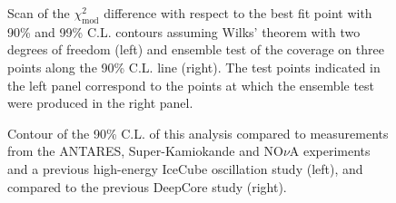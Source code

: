 %     

\begin{figure}
    \centering
    
    \hfill
    
    \caption{Scan of the $\chi^2_{\mathrm{mod}}$ difference with respect to the best fit point with 90\% and 99\% C.L. contours assuming Wilks' theorem with two degrees of freedom (left) and ensemble test of the coverage on three points along the 90\% C.L. line (right). The test points indicated in the left panel correspond to the points at which the ensemble test were produced in the right panel.}
    \label{fig:sterile-contour-scan}
\end{figure}

\begin{figure}
    \centering

    
    
    \caption{Contour of the 90\% C.L. of this analysis compared to measurements from the ANTARES\cite{ANTARES:2018rtf}, Super-Kamiokande\cite{Super-Kamiokande:2014ndf} and NO$\nu$A\cite{nova-sterile} experiments and a previous high-energy IceCube oscillation study\cite{MEOWS} (left), and compared to the previous DeepCore study\cite{deepcore_sterile_2017} (right).}
    \label{fig:sterile-contour-context}
\end{figure}

%     
